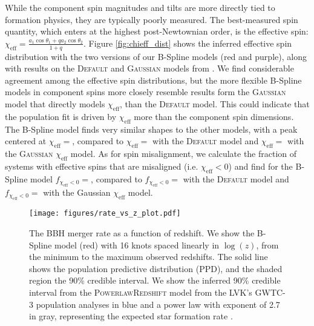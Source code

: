 While the component spin magnitudes and tilts are more directly tied to formation physics, they are typically poorly measured.  The best-measured spin quantity, which enters at the highest post-Newtownian order, is the effective spin: $\chi_\mathrm{eff} = \frac{a_1\cos{\theta_1} + qa_2\cos{\theta_2}}{1+q}$. Figure \ref{fig:chieff_dist} 
shows the inferred effective spin distribution with the two versions of our B-Spline models (red and purple), 
along with results on the \textsc{Default} and \textsc{Gaussian} models from \citet{o3b_astro_dist}. We find considerable agreement 
among the effective spin distributions, but the more flexible B-Spline models in component spins more closely resemble results form the \textsc{Gaussian} model that directly models $\chi_\mathrm{eff}$, than the \textsc{Default} model. This could indicate that the population fit is driven by $\chi_\mathrm{eff}$ 
more than the component spin dimensions. The B-Spline model finds very similar shapes to the other models, with a peak centered at 
$\chi_\mathrm{eff}=$\result{$\CIPlusMinus{\macros[ChiEffective][iid][PeakChiEff]}$}, compared to 
$\chi_\mathrm{eff}=$\result{$\CIPlusMinus{\macros[ChiEffective][default][PeakChiEff]}$} with the \textsc{Default} model and 
$\chi_\mathrm{eff}=$\result{$\CIPlusMinus{\macros[ChiEffective][gaussian][PeakChiEff]}$} with the \textsc{Gaussian} $\chi_\mathrm{eff}$ model. 
As for spin misalignment, we calculate the fraction of systems with effective spins that are misaligned (i.e. $\chi_\mathrm{eff}<0$) and 
find for the B-Spline model $f_{\chi_\mathrm{eff}<0}=$\result{$\CIPlusMinus{\macros[ChiEffective][iid][FracBelow0]}$}, compared to 
$f_{\chi_\mathrm{eff}<0}=$\result{$\CIPlusMinus{\macros[ChiEffective][default][FracBelow0]}$} with the \textsc{Default} model and 
$f_{\chi_\mathrm{eff}<0}=$\result{$\CIPlusMinus{\macros[ChiEffective][gaussian][FracBelow0]}$} with the Gaussian $\chi_\mathrm{eff}$ model.

\begin{figure}[h]
    \texttt{[image: figures/rate\_vs\_z\_plot.pdf]}
    \caption{The BBH merger rate as a function of redshift. We show the B-Spline model (red) with 16 knots spaced linearly in $\log(z)$, 
    from the minimum to the maximum observed redshifts. The solid line shows the population predictive distribution (PPD), and the shaded region 
    the 90\% credible interval. We show the inferred 90\% credible interval from the \textsc{PowerlawRedshift} model 
    from the LVK's GWTC-3 population analyses in blue and a power law with exponent of 2.7 in gray, representing the expected star formation rate 
    \citep{Madau_2014, o3b_astro_dist}.}
    \label{fig:rofz}
\end{figure}



